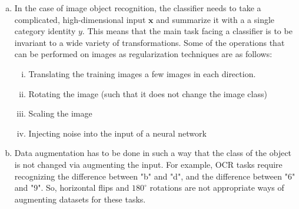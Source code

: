 \documentclass[fleqn]{article}
\begin{document}
\begin{enumerate}[a)]
	\item
	In the case of image object recognition, the classifier needs to take a complicated, high-dimensional input $\bm{x}$ and summarize it with a a single category identity $y$. This means that the main task facing a classifier is to be invariant to a wide variety of transformations. Some of the operations that can be performed on images as regularization techniques are as follows:
		\begin{enumerate}[i)]
			\item Translating the training images a few images in each direction.
			\item Rotating the image (such that it does not change the image class)
			\item Scaling the image
			\item Injecting noise into the input of a neural network
		\end{enumerate}
	\item
	Data augmentation has to be done in such a way that the class of the object is not changed via augmenting the input. For example, OCR tasks require recognizing the difference between "b" and "d", and the difference between "6" and "9". So, horizontal flips and $180^{\circ}$ rotations are not appropriate ways of augmenting datasets for these tasks.
	

\end{enumerate}
\end{document}

